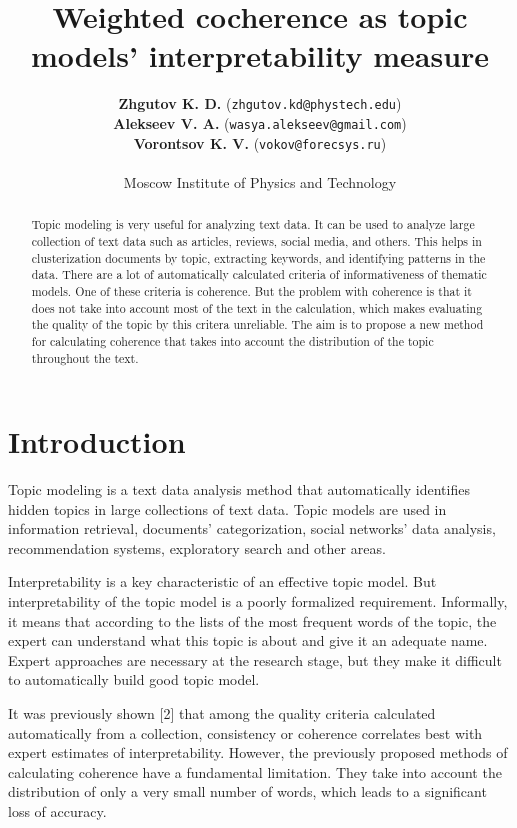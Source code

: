 \documentclass{article}
\title{Weighted cocherence as topic models' interpretability measure}
\author{ 
\textbf{Zhgutov K. D.} (\texttt{zhgutov.kd@phystech.edu}) \\
\textbf{Alekseev V. A.} (\texttt{wasya.alekseev@gmail.com}) \\
\textbf{Vorontsov K. V.} (\texttt{vokov@forecsys.ru}) \\
\\
Moscow Institute of Physics and Technology
}
\date{}
\begin{document}
\maketitle

\begin{abstract}
Topic modeling is very useful for analyzing text data. It can be used to analyze large collection of text data such as articles, reviews, social media, and others. This helps in clusterization documents by topic, extracting keywords, and identifying patterns in the data. There are a lot of automatically calculated criteria of informativeness of thematic models. One of these criteria is coherence. But the problem with coherence is that it does not take into account most of the text in the calculation, which makes evaluating the quality of the topic by this critera unreliable. The aim is to propose a new method for calculating coherence that takes into account the distribution of the topic throughout the text.
\end{abstract}



\section{Introduction}
Topic modeling is a text data analysis method that automatically identifies hidden topics in large collections of text data. Topic models are used in information retrieval, documents’ categorization, social networks’ data analysis, recommendation systems, exploratory search and other areas.

Interpretability is a key characteristic of an effective topic model. But interpretability of the topic model is a poorly formalized requirement. Informally, it means that according to the lists of the most frequent words of the topic, the expert can understand what this topic is about and give it an adequate name. Expert approaches are necessary at the research stage, but they make it difficult to automatically build good topic model.

It was previously shown [2] that among the quality criteria calculated automatically from a collection, consistency or coherence correlates best with expert estimates of interpretability. However, the previously proposed methods of calculating coherence have a fundamental limitation. They take into account the distribution of only a very small number of words, which leads to a significant loss of accuracy.
\end{document}
